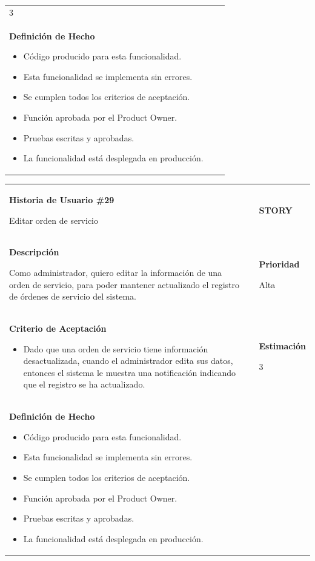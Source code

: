\documentclass[12pt,a4paper]{article}
\begin{document}
\begin{center}
\begin{tabular}{| p{10cm} c p{2.5cm}|}
3 \\ 

\textbf{Definición de Hecho}

\begin{itemize}
\item Código producido para esta funcionalidad.
\item Esta funcionalidad se implementa sin errores.
\item Se cumplen todos los criterios de aceptación.
\item Función aprobada por el Product Owner.
\item Pruebas escritas y aprobadas.
\item La funcionalidad está desplegada en producción.
\end{itemize} & & \\
\hline  
\end{tabular}
\vspace{5mm}

\begin{tabular}{| p{10cm} c p{2.5cm}|}
\hline 
\textbf{Historia de Usuario \#29}

Editar orden de servicio & & \textbf{{\Large STORY}} \\ 
\textbf{Descripción}

Como administrador, quiero editar la información de una orden de servicio, para
poder mantener actualizado el registro de órdenes de servicio del sistema. &  & \textbf{Prioridad}

Alta\\

\textbf{Criterio de Aceptación}

\begin{itemize}
\item Dado que una orden de servicio tiene información desactualizada, cuando
el administrador edita sus datos, entonces el sistema le muestra
una notificación indicando que el registro se ha actualizado.
\end{itemize} & & \textbf{Estimación}

3 \\ 

\textbf{Definición de Hecho}

\begin{itemize}
\item Código producido para esta funcionalidad.
\item Esta funcionalidad se implementa sin errores.
\item Se cumplen todos los criterios de aceptación.
\item Función aprobada por el Product Owner.
\item Pruebas escritas y aprobadas.
\item La funcionalidad está desplegada en producción.
\end{itemize} & & \\
\hline  
\end{tabular}
\vspace{5mm}


\end{center}
\end{document}
